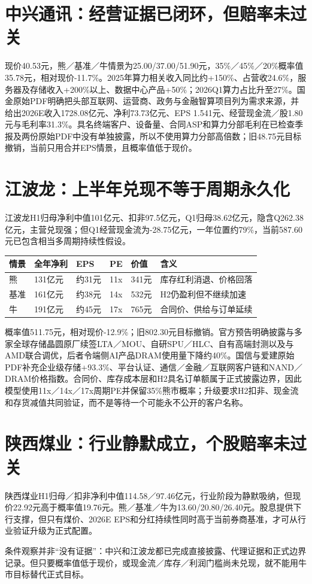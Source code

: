 \section{中兴通讯：经营证据已闭环，但赔率未过关}

现价40.53元，熊／基准／牛情景为25.00/37.00/51.90元，35\%／45\%／20\%概率值35.78元，相对现价-11.7\%。2025年算力相关收入同比约+150\%、占营收24.6\%，服务器及存储收入+200\%以上、数据中心产品+50\%；2026Q1算力占比升至27\%。国金原始PDF明确把头部互联网、运营商、政务与金融智算项目列为需求来源，并给出2026E收入1728.08亿元、净利73.73亿元、EPS 1.541元、经营现金流／股1.80元与毛利率31.3\%。具名终端客户、设备量、合同ASP和算力分部毛利在已检查季报及两份原始PDF中没有单独披露，所以不使用算力分部高倍数；旧48.75元目标撤销，当前只用合并EPS情景，且概率值低于现价。

\section{江波龙：上半年兑现不等于周期永久化}

江波龙H1归母净利中值101亿元、扣非97.5亿元，Q1归母38.62亿元，隐含Q262.38亿元，主营兑现强；但Q1经营现金流为-28.75亿元，一年位置约79\%，当前587.60元已包含相当多周期持续性假设。

\begin{exhibitbox}
\begin{tabularx}{\textwidth}{L{1.6cm}R{1.5cm}R{1.4cm}R{1.3cm}R{1.4cm}X}
\toprule
\textbf{情景} & \textbf{全年净利} & \textbf{EPS} & \textbf{PE} & \textbf{价值} & \textbf{含义} \\
\midrule
熊 & 131亿元 & 约31元 & 11x & 341元 & 库存红利消退、价格回落 \\
基准 & 161亿元 & 约38元 & 14x & 532元 & H2仍盈利但不继续加速 \\
牛 & 191亿元 & 约45元 & 17x & 765元 & 合同价、供给与订单延续 \\
\bottomrule
\end{tabularx}
\end{exhibitbox}

概率值511.75元，相对现价-12.9\%；旧802.30元目标撤销。官方预告明确披露与多家全球存储晶圆原厂续签LTA／MOU、自研SPU／HLC、自有高端封测以及与AMD联合调优，后者令端侧AI产品DRAM使用量下降约40\%。国信与爱建原始PDF补充企业级存储+93.3\%、平台认证、通信／金融／互联网客户链和NAND／DRAM价格指数。合同价、库存成本层和H2具名订单额属于正式披露边界，因此模型使用11x／14x／17x周期PE并保留35\%熊市概率；升级要求H2扣非、现金流和存货减值共同验证，而不是等待一个可能永不公开的客户名称。

\section{陕西煤业：行业静默成立，个股赔率未过关}

陕西煤业H1归母／扣非净利中值114.58／97.46亿元，行业阶段为静默吸纳，但现价22.92元高于概率值19.76元。熊／基准／牛为13.60/20.80/26.40元。股息提供下行支撑，但只有煤价、2026E EPS和分红持续性同时高于当前券商基准，才可从行业验证升级为正式配置。

\begin{riskbox}[降级原则]
条件观察并非“没有证据”：中兴和江波龙都已完成直接披露、代理证据和正式边界记录。但只要概率值低于现价，或现金流／库存／利润门槛尚未兑现，就不能用牛市目标替代正式目标。
\end{riskbox}
